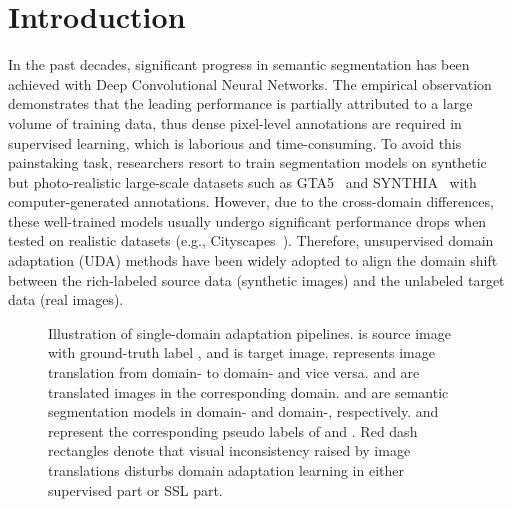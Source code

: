 \documentclass[10pt,twocolumn,letterpaper]{article}
\begin{document}
\section{Introduction \label{section:intro}}
In the past decades, significant progress \cite{zhao2017pspnet, chen2018deeplab,xiao2018unified,WangSCJDZLMTWLX19,YuanCW20,tao2020hierarchical,mohan2020efficientps} in semantic segmentation has been achieved with Deep Convolutional Neural Networks. The empirical observation \cite{raffel2019exploring, xie2019self} demonstrates that the leading performance is partially attributed to a large volume of training data, thus dense pixel-level annotations are required in supervised learning, which is laborious and time-consuming. To avoid this painstaking task, researchers resort to train segmentation models on synthetic but photo-realistic large-scale datasets such as GTA5~\cite{richter2016playing} and SYNTHIA~\cite{ros2016synthia} with computer-generated annotations. However, due to the cross-domain differences, these well-trained models usually undergo significant performance drops when tested on realistic datasets (e.g., Cityscapes~\cite{cordts2016cityscapes}). Therefore, unsupervised domain adaptation (UDA) methods have been widely adopted to align the domain shift between the rich-labeled source data (synthetic images) and the unlabeled target data (real images). 
\begin{figure}[t]
    \centering 
    \vspace{-0.1cm}
  
\caption{Illustration of single-domain adaptation pipelines.  is source image with ground-truth label , and  is target image.  represents image translation from domain- to domain- and vice versa.  and  are translated images in the corresponding domain.  and  are semantic segmentation models in domain- and domain-, respectively.  and  represent the corresponding pseudo labels of  and . Red dash rectangles denote that visual inconsistency raised by image translations disturbs domain adaptation learning in either supervised part or SSL part.}
    \label{fig:flowchat}
    \vspace{-0.7cm}
\end{figure}
\end{document}
